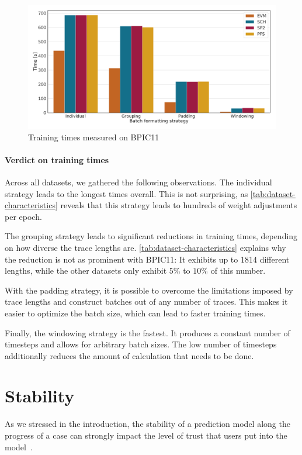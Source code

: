 \begin{figure}[!htb]
    \centering
    \includegraphics[width=\textwidth]{gfx/bpic2011/train_timings.pdf}
    \caption{Training times measured on BPIC11}
    \label{fig:BPIC11-training-timings}
\end{figure}

\paragraph{Verdict on training times}
Across all datasets, we gathered the following observations.
The individual strategy leads to the longest times overall.
This is not surprising, as \autoref{tab:dataset-characteristics} reveals that this strategy leads to hundreds of weight adjustments per epoch.

The grouping strategy leads to significant reductions in training times, depending on how diverse the trace lengths are. \autoref{tab:dataset-characteristics} explains why the reduction is not as prominent with BPIC11: It exhibits up to 1814 different lengths, while the other datasets only exhibit $5\%$ to $10\%$ of this number.

With the padding strategy, it is possible to overcome the limitations imposed by trace lengths and construct batches out of any number of traces. This makes it easier to optimize the batch size, which can lead to faster training times.

Finally, the windowing strategy is the fastest.
It produces a constant number of timesteps and allows for arbitrary batch sizes.
The low number of timesteps additionally reduces the amount of calculation that needs to be done.
\FloatBarrier

\section{Stability}\label{sec:eval:stability}
As we stressed in the introduction, the stability of a prediction model along the progress of a case can strongly impact the level of trust that users put into the model~\cite{metzger2015}.

